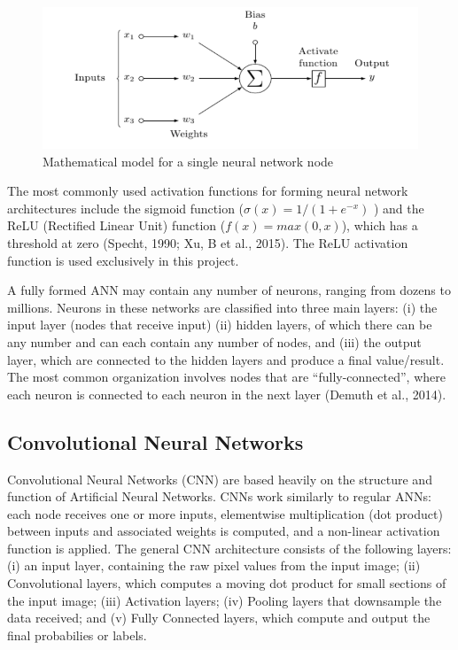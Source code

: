 \documentclass[12pt,]{article}
\begin{document}
\begin{figure}[H]

{\centering \includegraphics{figure/graphics-unnamed-chunk-2-1} 

}

\caption{Mathematical model for a single neural network node}\label{fig:unnamed-chunk-2}
\end{figure}

The most commonly used activation functions for forming neural network
architectures include the sigmoid function (\(\sigma(x)=1/(1+e^{−x})\) )
and the ReLU (Rectified Linear Unit) function (\(f(x)=max(0,x)\)), which
has a threshold at zero (Specht, 1990; Xu, B et al., 2015). The ReLU
activation function is used exclusively in this project.

A fully formed ANN may contain any number of neurons, ranging from
dozens to millions. Neurons in these networks are classified into three
main layers: (i) the input layer (nodes that receive input) (ii) hidden
layers, of which there can be any number and can each contain any number
of nodes, and (iii) the output layer, which are connected to the hidden
layers and produce a final value/result. The most common organization
involves nodes that are ``fully-connected'', where each neuron is
connected to each neuron in the next layer (Demuth et al., 2014).

\subsection{Convolutional Neural
Networks}\label{convolutional-neural-networks}

Convolutional Neural Networks (CNN) are based heavily on the structure
and function of Artificial Neural Networks. CNNs work similarly to
regular ANNs: each node receives one or more inputs, elementwise
multiplication (dot product) between inputs and associated weights is
computed, and a non-linear activation function is applied. The general
CNN architecture consists of the following layers: (i) an input layer,
containing the raw pixel values from the input image; (ii) Convolutional
layers, which computes a moving dot product for small sections of the
input image; (iii) Activation layers; (iv) Pooling layers that
downsample the data received; and (v) Fully Connected layers, which
compute and output the final probabilies or labels.
\end{document}
